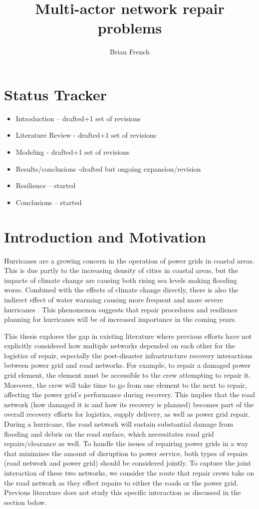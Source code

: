\documentclass{article}
\begin{document}
	\title{Multi-actor network repair problems}
	\author{Brian French}
	\maketitle
	\section{Status Tracker}
	\begin{itemize}
		\item Introduction -- drafted+1 set of revisions
		\item Literature Review - drafted+1 set of revisions
		\item Modeling - drafted+1 set of revisions
		\item Results/conclusions -drafted but ongoing expansion/revision
		\item Resilience -- started
		\item Conclusions -- started
	\end{itemize}
	\doublespacing
	\section{Introduction and Motivation}
	Hurricanes are a growing concern in the operation of power grids in coastal areas. This is due partly to the increasing density of cities in coastal areas, but the impacts of climate change are causing both rising sea levels making flooding worse. Combined with the effects of climate change directly, there is also the indirect effect of water warming causing more frequent and more severe hurricanes \cite{MannEA2006}. This phenomenon suggests that repair procedures and resilience planning for hurricanes will be of increased importance in the coming years.
	
	This thesis explores the gap in existing literature where previous efforts have not explicitly considered how multiple networks depended on each other for the logistics of repair, especially the post-disaster infrastructure recovery interactions between power grid and road networks. For example, to repair a damaged power grid element, the element must be accessible to the crew attempting to repair it. Moreover, the crew will take time to go from one element to the next to repair, affecting the power grid's performance during recovery. This implies that the road network (how damaged it is and how its recovery is planned) becomes part of the overall recovery efforts for logistics, supply delivery, as well as power grid repair. During a hurricane, the road network will sustain substantial damage from flooding and debris on the road surface, which necessitates road grid repairs/clearance as well. To handle the issues of repairing power grids in a way that minimizes the amount of disruption to power service, both types of repairs (road network and power grid) should be considered jointly. To capture the joint interaction of these two networks, we consider the route that repair crews take on the road network as they effect repairs to either the roads or the power grid. Previous literature does not study this specific interaction as discussed in the section below.
\end{document}

